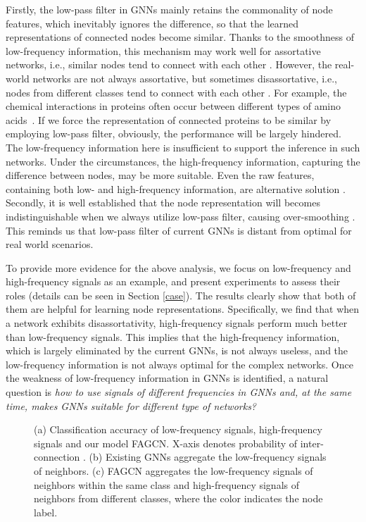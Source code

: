 \documentclass[letterpaper]{article} \usepackage{aaai21}  \usepackage{times}  \usepackage{helvet} \usepackage{courier}  \usepackage[hyphens]{url}  \usepackage{graphicx} \urlstyle{rm} \def\UrlFont{\rm}  \usepackage{natbib}  \usepackage{caption} \frenchspacing  \setlength{\pdfpagewidth}{8.5in}  \setlength{\pdfpageheight}{11in}
\begin{document}
Firstly, the low-pass filter in GNNs mainly retains the commonality of node features, which inevitably ignores the difference, so that the learned representations of connected nodes become similar. Thanks to the smoothness of low-frequency information, this mechanism may work well for assortative networks, i.e., similar nodes tend to connect with each other \cite{GraphHeat}. 
However, the real-world networks are not always assortative, but sometimes disassortative, i.e., nodes from different classes tend to connect with each other \cite{mixing}. 
For example, the chemical interactions in proteins often occur between different types of amino acids~\cite{H2GNN}.
If we force the representation of connected proteins to be similar by employing low-pass filter, obviously, the performance will be largely hindered. The low-frequency information here is insufficient to support the inference in such networks. Under the circumstances, the high-frequency information, capturing the difference between nodes, may be more suitable. Even the raw features, containing both low- and high-frequency information, are alternative solution \cite{AM-GCN}. Secondly, it is well established that the node representation will becomes indistinguishable when we always utilize low-pass filter, causing over-smoothing \cite{lossexp}. This reminds us that low-pass filter of current GNNs is distant from optimal for real world scenarios.

To provide more evidence for the above analysis, we focus on low-frequency and high-frequency signals as an example, and present experiments to assess their roles (details can be seen in Section \ref{case}). 
The results clearly show that both of them are helpful for learning node representations. Specifically, we find that when a network exhibits disassortativity, high-frequency signals perform much better than low-frequency signals.
This implies that the high-frequency information, which is largely eliminated by the current GNNs, is not always useless, and the low-frequency information is not always optimal for the complex networks.
Once the weakness of low-frequency information in GNNs is identified, a natural question is \emph{how to use signals of different frequencies in GNNs and, at the same time, makes GNNs suitable for different type of networks?}

\begin{figure*}
\centering
{}
\caption{(a) Classification accuracy of low-frequency signals, high-frequency signals and our model FAGCN. X-axis denotes probability of inter-connection . (b) Existing GNNs aggregate the low-frequency signals of neighbors. (c) FAGCN aggregates the low-frequency signals of neighbors within the same class and high-frequency signals of neighbors from different classes, where the color indicates the node label.}
\label{intro}
\end{figure*}
\end{document}
